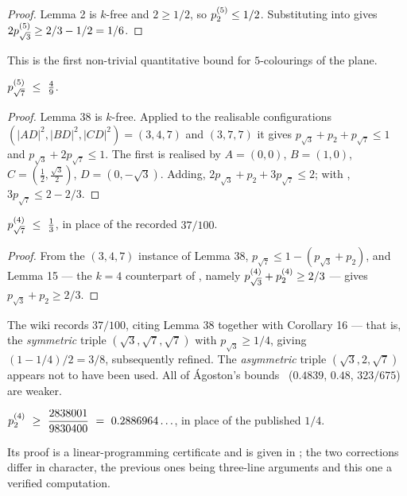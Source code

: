 \begin{proof}
Lemma 2 is $k$-free and $2\ge1/2$, so $p^{(5)}_{2}\le1/2$. Substituting into
 gives $2p^{(5)}_{\sqrt3}\ge 2/3-1/2=1/6$.
\end{proof}

This is the first non-trivial quantitative bound for $5$-colourings of the
plane.

\begin{theorem}
$p^{(5)}_{\sqrt7}\ \le\ \tfrac49$.
\end{theorem}

\begin{proof}
Lemma 38 is $k$-free. Applied to the realisable configurations
$(|AD|^2,|BD|^2,|CD|^2)=(3,4,7)$ and $(3,7,7)$ it gives
$p_{\sqrt3}+p_2+p_{\sqrt7}\le1$ and $p_{\sqrt3}+2p_{\sqrt7}\le1$. The first is
realised by $A=(0,0)$, $B=(1,0)$, $C=(\tfrac12,\tfrac{\sqrt3}{2})$,
$D=(0,-\sqrt3)$. Adding, $2p_{\sqrt3}+p_2+3p_{\sqrt7}\le2$; with
, $3p_{\sqrt7}\le 2-2/3$.
\end{proof}

\begin{theorem}[correction at $k=4$]
\label{thm:sqrt7four}
$p^{(4)}_{\sqrt7}\ \le\ \tfrac13$, in place of the recorded $37/100$.
\end{theorem}

\begin{proof}
From the $(3,4,7)$ instance of Lemma 38, $p_{\sqrt7}\le1-(p_{\sqrt3}+p_2)$, and
Lemma 15 --- the $k=4$ counterpart of , namely
$p^{(4)}_{\sqrt3}+p^{(4)}_{2}\ge2/3$ --- gives $p_{\sqrt3}+p_2\ge2/3$.
\end{proof}

The wiki records $37/100$, citing Lemma 38 together with Corollary 16 --- that
is, the \emph{symmetric} triple $(\sqrt3,\sqrt7,\sqrt7)$ with $p_{\sqrt3}\ge1/4$,
giving $(1-1/4)/2=3/8$, subsequently refined. The \emph{asymmetric} triple
$(\sqrt3,2,\sqrt7)$ appears not to have been used. All of \'Agoston's bounds~\cite{Agoston}
($0.4839$, $0.48$, $323/675$) are weaker.

\begin{theorem}[correction at $k=4$]
\label{thm:certificate}
$\displaystyle \pk{4}{2}\ \ge\ \frac{2838001}{9830400}\ =\ 0.2886964\ldots$,
in place of the published $1/4$.
\end{theorem}

Its proof is a linear-programming certificate and is given in
; the two corrections differ in character, the previous
ones being three-line arguments and this one a verified computation.

